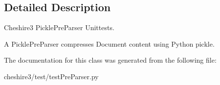 \subsection{Detailed Description}
\begin{DoxyVerb}Cheshire3 PicklePreParser Unittests.
 
A PicklePreParser compresses Document content using Python pickle.
\end{DoxyVerb}
 

The documentation for this class was generated from the following file\-:\begin{DoxyCompactItemize}
\item 
cheshire3/test/test\-Pre\-Parser.\-py\end{DoxyCompactItemize}
